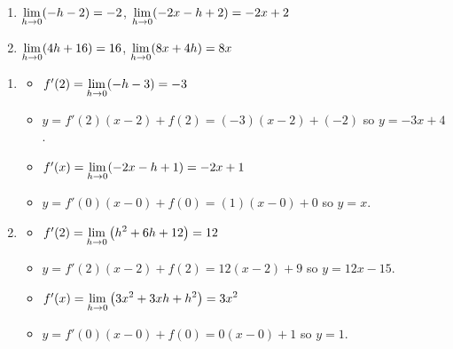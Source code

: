 \documentclass{ximera}
\begin{document}
\begin{enumerate}
\setcounter{enumi}{\value{HW}}

\item    $\ds{\lim_{h \rightarrow 0} (-h-2) = -2}$,   $\ds{\lim_{h \rightarrow 0} (-2x-h+2) = -2x+2}$   
\item   $\ds{\lim_{h \rightarrow 0} (4h+16) = 16}$,   $\ds{\lim_{h \rightarrow 0} (8x+4h) = 8x}$ 

\setcounter{HW}{\value{enumi}}
\end{enumerate}

\begin{enumerate}
\setcounter{enumi}{\value{HW}}

\item \begin{itemize}  \item $f'(2) = \ds{\lim_{h \rightarrow 0} (-h-3) = -3}$

\smallskip

\item  $y = f'(2)(x-2) + f(2) = (-3)(x-2)+(-2)$ so $y  = -3x+4$.

\smallskip

\item   $f'(x) =  \ds{\lim_{h \rightarrow 0} (-2x-h+1) = -2x+1}$ 

\smallskip

\item  $y = f'(0)(x-0) + f(0) = (1)(x-0) + 0$ so $y = x$.

\smallskip

\end{itemize}

\item \begin{itemize}

\item $f'(2) = \ds{\lim_{h \rightarrow 0} \left( h^2+6h+12 \right) = 12}$

\smallskip

\item  $y = f'(2)(x-2) + f(2) = 12(x-2)+ 9$ so $y = 12x - 15$.

\smallskip

\item  $f'(x) = \ds{\lim_{h \rightarrow 0} \left(3x^{2} + 3xh + h^{2} \right) = 3x^{2}}$ 

\smallskip

\item $y = f'(0)(x-0)+f(0) = 0(x-0)+1$ so $y = 1$.

\smallskip

\end{itemize} 

\setcounter{HW}{\value{enumi}}
\end{enumerate}
\end{document}
